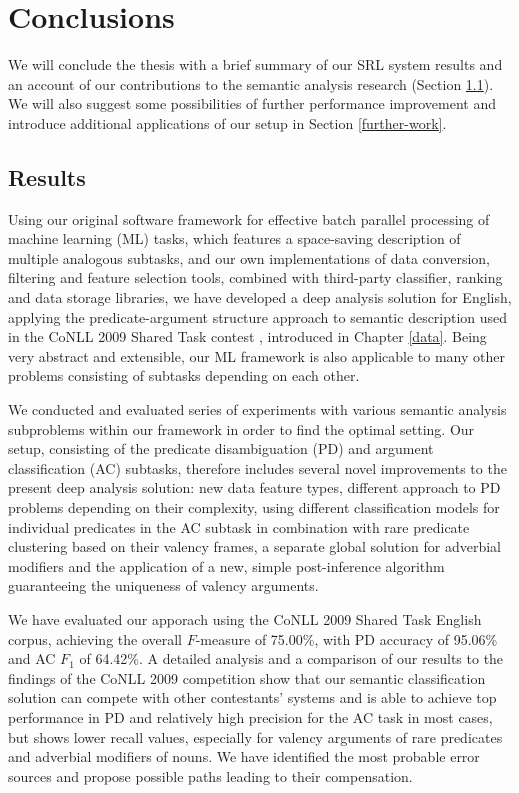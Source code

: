 \documentclass[12pt,notitlepage]{report}
\begin{document}
%
%
\chapter{Conclusions}\label{conclusions}
%
%

We will conclude the thesis with a brief summary of our SRL system results and an account of our contributions to the semantic analysis research (Section \ref{discussion}). We will also suggest some possibilities of further performance improvement and introduce additional applications of our setup in Section \ref{further-work}.

\section{Results}\label{discussion}

Using our original software framework for effective batch parallel processing of machine learning (ML) tasks, which features a space-saving description of multiple analogous subtasks, and our own implementations of data conversion, filtering and feature selection tools, combined with third-party classifier, ranking and data storage libraries, we have developed a deep analysis solution for English, applying the predicate-argument structure approach to semantic description used in the CoNLL 2009 Shared Task contest \citep{hajic09}, introduced in Chapter \ref{data}. Being very abstract and extensible, our ML framework is also applicable to many other problems consisting of subtasks depending on each other.

We conducted and evaluated series of experiments with various semantic analysis subproblems within our framework in order to find the optimal setting. Our setup, consisting of the predicate disambiguation (PD) and argument classification (AC) subtasks, therefore includes several novel improvements to the present deep analysis solution: new data feature types, different approach to PD problems depending on their complexity, using different classification models for individual predicates in the AC subtask in combination with rare predicate clustering based on their valency frames, a separate global solution for adverbial modifiers and the application of a new, simple post-inference algorithm guaranteeing the uniqueness of valency arguments.

We have evaluated our apporach using the CoNLL 2009 Shared Task English corpus, achieving the overall $F$-measure of 75.00\%, with PD accuracy of 95.06\% and AC $F_1$ of 64.42\%. A detailed analysis and a comparison of our results to the findings of the CoNLL 2009 competition show that our semantic classification solution can compete with other contestants' systems and is able to achieve top performance in PD and relatively high precision for the AC task in most cases, but shows lower recall values, especially for valency arguments of rare predicates and adverbial modifiers of nouns. We have identified the most probable error sources and propose possible paths leading to their compensation.
\end{document}
